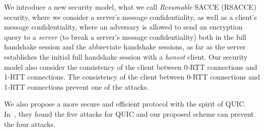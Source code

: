 We introduce a new
security model, what we call \textit{Resumable} SACCE
(RSACCE) security, where we consider a server's message
confidentiality, as well as a client's message
confidentiality, where an adversary is allowed to send
an encryption query to a \textit{server} (to break a
server's message confidentiality) both in the full
handshake session and the abbreviate handshake sessions,
as far as the server establishes the initial full
handshake session with a \textit{honest} client.
Our security model also consider the consistency of the client between
0-RTT connections and 1-RTT connections.
The consistency of the client between 0-RTT connections
and 1-RTT connections prevent one of the attacks.

We also propose a more secure and efficient protocol with
the spirit of QUIC.
In~\cite{LJBN15:QUIC}, they found the five attacks for
QUIC and our proposed scheme can prevent the four attacks.